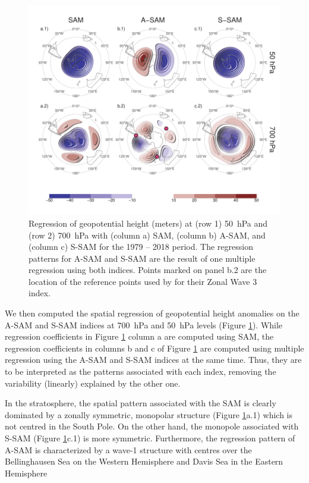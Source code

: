 \documentclass[smallextended]{svjour3}       %
\begin{document}
\begin{figure}
\includegraphics{2d-regr-1} \caption{Regression of geopotential height (meters) at (row 1) 50~hPa and (row 2) 700~hPa with (column a) SAM, (column b) A\nobreakdash-SAM, and (column c) S\nobreakdash-SAM for the 1979 -- 2018 period. The regression patterns for A\nobreakdash-SAM and S\nobreakdash-SAM are the result of one multiple regression using both indices. Points marked on panel b.2 are the location of the reference points used by \cite{raphael2004} for their Zonal Wave 3 index. }\label{fig:2d-regr}
\end{figure}

We then computed the spatial regression of geopotential height anomalies on the A\nobreakdash-SAM and S\nobreakdash-SAM indices at 700~hPa and 50~hPa levels (Figure \ref{fig:2d-regr}). While regression coefficients in Figure \ref{fig:2d-regr} column a are computed using SAM, the regression coefficients in columns b and c of Figure \ref{fig:2d-regr} are computed using multiple regression using the A\nobreakdash-SAM and S\nobreakdash-SAM indices at the same time. Thus, they are to be interpreted as the patterns associated with each index, removing the variability (linearly) explained by the other one.

In the stratosphere, the spatial pattern associated with the SAM is clearly dominated by a zonally symmetric, monopolar structure (Figure \ref{fig:2d-regr}a.1) which is not centred in the South Pole. On the other hand, the monopole associated with S\nobreakdash-SAM (Figure \ref{fig:2d-regr}c.1) is more symmetric. Furthermore, the regression pattern of A\nobreakdash-SAM is characterized by a wave-1 structure with centres over the Bellinghausen Sea on the Western Hemisphere and Davis Sea in the Eastern Hemisphere
\end{document}
